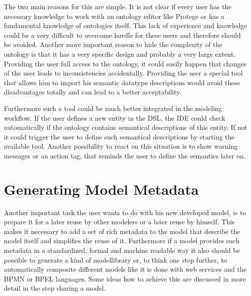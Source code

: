 The two main reasons for this are simple. It is not clear if every user has the necessary knowledge to work with an ontology editor like Protege or has a fundamental knowledge of ontologies itself. This lack of experience and knowledge could be a very difficult to overcome hurdle for these users and therefore should be avoided. Another more important reason to hide the complexity of the ontology is that it has a very specific design and probably a very large extent. Providing the user full access to the ontology, it could easily happen that changes of  the user leads to inconsistencies accidentally. Providing the user a special tool that allows him to import his semantic datatype descriptions would avoid these disadvantages totally and can lead to a better acceptability. 


Furthermore such a tool could be much better integrated in the modeling workflow. If the user defines a new entity in the DSL, the IDE could check automatically if the ontology contains semantical descriptions of this entity. If not it could trigger the user to define such semantical descriptions by starting the available tool. Another possibility to react on this situation is to show warning messages or an action tag, that reminds the user to define the semantics later on.

\section{Generating Model Metadata}

Another important task the user wants to do with his new developed model, is to prepare it for a later reuse by other modelers or a later reuse by himself. This makes it necessary to add a set of rich metadata to the model that describe the model itself and simplifies the reuse of it. Furthermore if a model provides such metadata in a standardized, formal and machine readable way it also should be possible to generate a kind of modellibrary or, to think one step further, to automatically composite different models like it is done with web services and the BPMN or BPEL languages. Some ideas how to achieve this are discussed in more detail in the step sharing a model.


